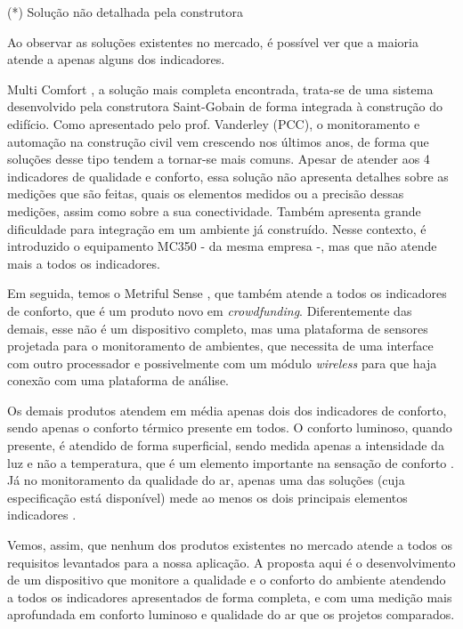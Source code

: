 \documentclass[../monografia.tex]{subfiles}
\begin{document}
\begin{flushright}
(*) Solução não detalhada pela construtora
\end{flushright}


Ao observar as soluções existentes no mercado, é possível ver que a maioria atende a apenas alguns dos indicadores. 

Multi Comfort \cite{multicomfort}, a solução mais completa encontrada, trata-se de uma sistema desenvolvido pela construtora Saint-Gobain de forma integrada à construção do edifício. Como apresentado pelo prof. Vanderley (PCC), o monitoramento e automação na construção civil vem crescendo nos últimos anos, de forma que soluções desse tipo tendem a tornar-se mais comuns. 
Apesar de atender aos 4 indicadores de qualidade e conforto, essa solução não apresenta detalhes sobre as medições que são feitas, quais os elementos medidos ou a precisão dessas medições, assim como sobre a sua conectividade. Também apresenta grande dificuldade para integração em um ambiente já construído. Nesse contexto, é introduzido o equipamento MC350\cite{mc350} - da mesma empresa -, mas que não atende mais a todos os indicadores. 

Em seguida, temos o Metriful Sense \cite{metriful}, que também atende a todos os indicadores de conforto, que é um produto novo em \textit{crowdfunding}. Diferentemente das demais, esse não é um dispositivo completo, mas uma plataforma de sensores projetada para o monitoramento de ambientes, que necessita de uma interface com outro processador e possivelmente com um módulo \textit{wireless} para que haja conexão com uma plataforma de análise. 

Os demais produtos atendem em média apenas dois dos indicadores de conforto, sendo apenas o conforto térmico presente em todos. O conforto luminoso, quando presente, é atendido de forma superficial, sendo medida apenas a intensidade da luz e não a temperatura, que é um elemento importante na sensação de conforto \cite{VisualComfort}. Já no monitoramento da qualidade do ar, apenas uma das soluções \cite{ECOMLITE} (cuja especificação está disponível) mede ao menos os dois principais elementos indicadores \cite{AirQuality}. 

Vemos, assim, que nenhum dos produtos existentes no mercado atende a todos os requisitos levantados para a nossa aplicação. A proposta aqui é o desenvolvimento de um dispositivo que monitore a qualidade e o conforto do ambiente atendendo a todos os indicadores apresentados de forma completa, e com uma medição mais aprofundada em conforto luminoso e qualidade do ar que os projetos comparados. 
\end{document}
